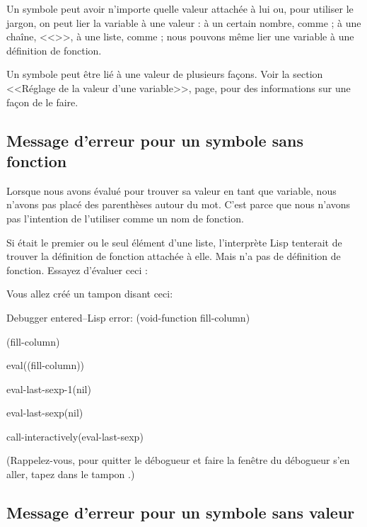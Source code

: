 Un symbole peut avoir n'importe quelle valeur attachée à lui ou, pour
utiliser le jargon, on peut lier la variable à une valeur : à un
certain nombre, comme  ; à une chaîne, <<>>, à une
liste, comme ; nous pouvons même lier une
variable à une définition de fonction. 

Un symbole peut être lié à une valeur de plusieurs façons. Voir la
section <<Réglage de la valeur d'une variable>>,
page, pour des informations sur une façon de le faire.  

\subsection{Message d'erreur pour un symbole sans
  fonction}

Lorsque nous avons évalué  pour trouver sa valeur en
tant que variable, nous n'avons pas placé des parenthèses autour du
mot. C'est parce que nous n'avons pas l'intention de l'utiliser comme
un nom de fonction.

Si  était le premier ou le seul élément d'une liste,
l'interprète Lisp tenterait de trouver la définition de fonction
attachée à elle. Mais  n'a pas de définition de
fonction. Essayez d'évaluer ceci :
\begin{center}
\end{center}

Vous allez créé un tampon  disant ceci:
{\ttfamily
\begin{flushleft}
  Debugger entered--Lisp error: (void-function fill-column)

  (fill-column)

  eval((fill-column))

  eval-last-sexp-1(nil)

  eval-last-sexp(nil)

  call-interactively(eval-last-sexp)
\end{flushleft}
}

(Rappelez-vous, pour quitter le débogueur et faire la fenêtre du
débogueur s'en aller, tapez  dans le tampon .)


\subsection{Message d'erreur pour un symbole sans
  valeur}

